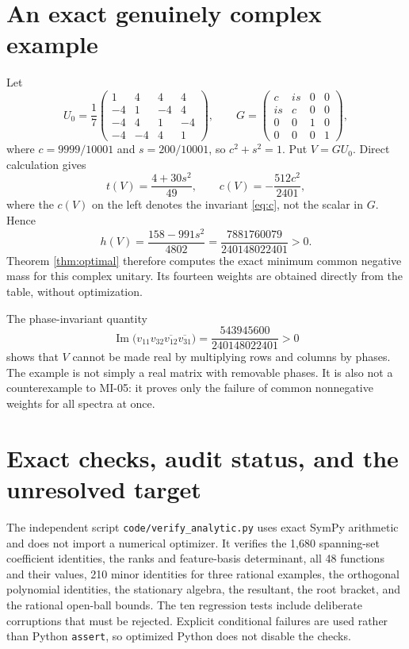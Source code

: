 \documentclass[11pt,a4paper]{article}
\begin{document}
\section{An exact genuinely complex example}
Let
\[
U_0=\frac17\begin{pmatrix}
1&4&4&4\\-4&1&-4&4\\-4&4&1&-4\\-4&-4&4&1
\end{pmatrix},\qquad
G=\begin{pmatrix}
c&is&0&0\\is&c&0&0\\0&0&1&0\\0&0&0&1
\end{pmatrix},
\]
where $c=9999/10001$ and $s=200/10001$, so $c^2+s^2=1$. Put $V=GU_0$. Direct calculation gives
\[
t(V)=\frac{4+30s^2}{49},\qquad c(V)=-\frac{512c^2}{2401},
\]
where the $c(V)$ on the left denotes the invariant \eqref{eq:c}, not the scalar in $G$. Hence
\[
h(V)=\frac{158-991s^2}{4802}
=\frac{7881760079}{240148022401}>0.
\]
Theorem \ref{thm:optimal} therefore computes the exact minimum common negative mass for this complex unitary. Its fourteen weights are obtained directly from the table, without optimization.

The phase-invariant quantity
\[
\operatorname{Im}\bigl(v_{11}v_{32}\overline{v_{12}}\overline{v_{31}}\bigr)
=\frac{543945600}{240148022401}>0
\]
shows that $V$ cannot be made real by multiplying rows and columns by phases. The example is not simply a real matrix with removable phases. It is also not a counterexample to MI-05: it proves only the failure of common nonnegative weights for all spectra at once.

\section{Exact checks, audit status, and the unresolved target}
The independent script \texttt{code/verify\_analytic.py} uses exact SymPy arithmetic and does not import a numerical optimizer. It verifies the 1,680 spanning-set coefficient identities, the ranks and feature-basis determinant, all 48 functions and their values, 210 minor identities for three rational examples, the orthogonal polynomial identities, the stationary algebra, the resultant, the root bracket, and the rational open-ball bounds. The ten regression tests include deliberate corruptions that must be rejected. Explicit conditional failures are used rather than Python \texttt{assert}, so optimized Python does not disable the checks.
\end{document}
